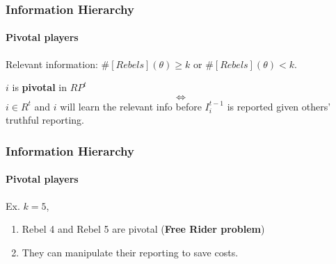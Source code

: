 \documentclass[9pt]{beamer}
\begin{document}
\begin{frame}
  \frametitle{Information Hierarchy}

\framesubtitle{Pivotal players}

Relevant information: $\#[Rebels](\theta)\geq k$ or $\#[Rebels](\theta)<k$.

\begin{definition}
$i$ is \textbf{pivotal} in $RP^t$
\[ \Leftrightarrow \]
$i\in R^t$ and $i$ {will} learn the relevant info {before} $I^{t-1}_i$ is reported {given} others' truthful reporting.
\end{definition}


\end{frame}

\begin{frame}[label=acyclic_diss]
  \frametitle{Information Hierarchy}
\framesubtitle{Pivotal players}



Ex. $k=5$,
\begin{center}
\end{center}
\begin{enumerate}
\item Rebel 4 and Rebel 5 are pivotal (\textbf{Free Rider problem})
\item They can manipulate their reporting to save costs.

\end{enumerate}


\hyperlink{cyclic_diss}{}
\end{frame}
\end{document}
